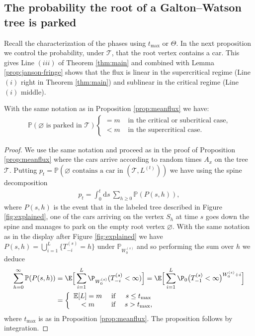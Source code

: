  
 \subsection{The probability the root of a Galton--Watson tree is parked}
 Recall the characterization of the phases using $t_{ \mathrm{max}}$ or $\Theta$. In the next proposition we control the probability, under $ \mathcal{T}$, that the root vertex contains a car.  This gives Line $(iii)$ of Theorem \ref{thm:main} and combined with Lemma \ref{prop:janson-fringe} shows that the flux is linear in the supercritical regime (Line $(i)$ right in Theorem \ref{thm:main}) and sublinear in the critical regime (Line $(i)$ middle). 
 \begin{proposition}\label{conj-GP} With the same notation as in Proposition \ref{prop:meanflux} we have:
\begin{eqnarray*}
 \mathbb{P}( \varnothing \mbox{ is parked in } \mathcal{T}) \left\{\begin{array}{ccl} \displaystyle =m & \mbox{ in the critical or subcritical case,} \\
 <m & \mbox{ in the supercritical case}.  \end{array} \right.
  \end{eqnarray*}
 \end{proposition}
 \begin{proof} We use the same notation and  proceed as in the proof of Proposition \ref{prop:meanflux} where the cars arrive according to random times $A_{x}$ on the tree $ \mathcal{T}$. Putting $ p_{t}= \mathbb{P}(\varnothing \mbox{ contains a car  in } (\mathcal{T}, L^{(t)}))$ we have using the spine decomposition 
 \begin{align*}
p_{t} = \int_{0}^{t}  \mathrm{d}s\  \sum_{h \geq 0} \mathbb{P}( P(s,h)), \end{align*}
where $P(s,h)$ is the event that in the labeled tree described in Figure \ref{fig:explained}, one of the cars arriving on the vertex $S_{h}$ at time $s$ goes down the spine and manages to park on the empty root vertex $\varnothing$. With the same notation as in the display after Figure \ref{fig:explained} we have 
$ P(s,h) =   \bigcup_{i=1}^{L} \{T_{-i}^{(s)}=h\}$ under $\mathbb{P}_{W_{0}^{(s)}}$ and so performing the sum over $h$ we deduce
\begin{align*}
\sum_{h=0}^{\infty}\mathbb{P}( P(s,h)) &= \E\Big[\sum_{i=1}^{L}  \P_{W_{0}^{(s)}}(T^{(s)}_{-i}<\infty) \Big]  = \E\Big[\sum_{i=1}^{L}  \P_{0} \big(T^{(s)}_{-1}<\infty\big)^{W_{0}^{(s)}+i} \Big] \\  &= \left\{ \begin{array}{ccc} \mathbb{E}[L] =m & \mbox{ if }& s \leq t_{\max}\\
< m & \mbox{ if }& s >t_{\max}, \end{array} \right.
\end{align*}
where $t_{\max}$ is as in Proposition \ref{prop:meanflux}. The proposition follows by integration.
\end{proof}

